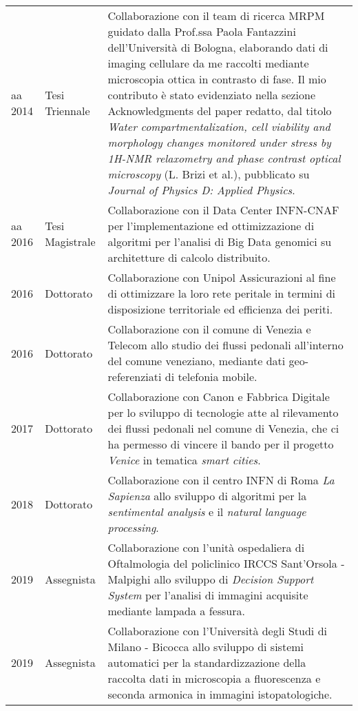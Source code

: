 \documentclass[a4paper,11pt]{article}
\begin{document}
\begin{tabular}{llp{12cm}}

  aa 2014             & Tesi Triennale  & Collaborazione con il team di ricerca MRPM guidato dalla Prof.ssa Paola Fantazzini dell'Università di Bologna, elaborando dati di imaging cellulare da me raccolti mediante microscopia ottica in contrasto di fase. Il mio contributo è stato evidenziato nella sezione Acknowledgments del paper redatto, dal titolo \emph{Water compartmentalization, cell viability and morphology changes monitored under stress by 1H-NMR relaxometry and phase contrast optical microscopy} (L. Brizi et al.), pubblicato su \emph{Journal of Physics D: Applied Physics}. \\
  aa 2016             & Tesi Magistrale & Collaborazione con il Data Center INFN-CNAF per l'implementazione ed ottimizzazione di algoritmi per l'analisi di Big Data genomici su architetture di calcolo distribuito.\\
  2016\textemdash2017 & Dottorato       & Collaborazione con Unipol Assicurazioni al fine di ottimizzare la loro rete peritale in termini di disposizione territoriale ed efficienza dei periti.\\
  2016\textemdash2017 & Dottorato       & Collaborazione con il comune di Venezia e Telecom allo studio dei flussi pedonali all'interno del comune veneziano, mediante dati geo-referenziati di telefonia mobile. \\
  2017\textemdash2018 & Dottorato       & Collaborazione con Canon e Fabbrica Digitale per lo sviluppo di tecnologie atte al rilevamento dei flussi pedonali nel comune di Venezia, che ci ha permesso di vincere il bando per il progetto \emph{Venice} in tematica \emph{smart cities}. \\
  2018\textemdash2019 & Dottorato       & Collaborazione con il centro INFN di Roma \emph{La Sapienza} allo sviluppo di algoritmi per la \emph{sentimental analysis} e il \emph{natural language processing}.\\
  2019                & Assegnista      & Collaborazione con l'unità ospedaliera di Oftalmologia del policlinico IRCCS Sant'Orsola - Malpighi allo sviluppo di \emph{Decision Support System} per l'analisi di immagini acquisite mediante lampada a fessura.\\
  2019\textemdash2022 & Assegnista      & Collaborazione con l'Università degli Studi di Milano - Bicocca allo sviluppo di sistemi automatici per la standardizzazione della raccolta dati in microscopia a fluorescenza e seconda armonica in immagini istopatologiche.\\

\end{tabular}
\end{document}
